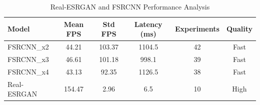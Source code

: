 \begin{table}[htbp]
\centering
\caption{Real-ESRGAN and FSRCNN Performance Analysis}
\label{tab:performance_analysis}
\begin{tabular}{|l|c|c|c|c|c|}
\hline
\textbf{Model} & \textbf{Mean FPS} & \textbf{Std FPS} & \textbf{Latency (ms)} & \textbf{Experiments} & \textbf{Quality} \\
\hline
FSRCNN\_x2 & 44.21 & 103.37 & 1104.5 & 42 & Fast \\
FSRCNN\_x3 & 46.61 & 101.18 & 998.1 & 39 & Fast \\
FSRCNN\_x4 & 43.13 & 92.35 & 1126.5 & 38 & Fast \\
Real-ESRGAN & 154.47 & 2.96 & 6.5 & 10 & High \\
\hline
\end{tabular}
\end{table}
